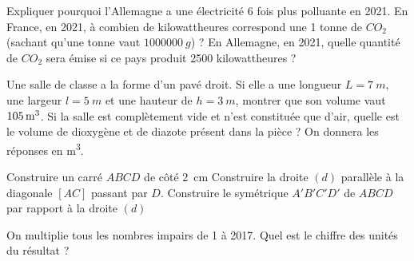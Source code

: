 \documentclass[../Cours.tex]{subfiles}
\begin{document}
\begin{questions}
    \question Expliquer pourquoi l'Allemagne a une électricité 6 fois plus polluante en 2021.
    \question En France, en 2021, à combien de kilowattheures correspond une 1 tonne de $CO_2$ (sachant qu'une tonne vaut $\qty{1000000}{g}$) ?
    \question En Allemagne, en 2021, quelle quantité de $CO_2$ sera émise si ce pays produit \num{2500} kilowattheures ?

    \clearpage

    \question Une salle de classe a la forme d'un pavé droit. Si elle a une longueur $L=\qty{7}{m}$, une largeur $l=\qty{5}{m}$ et une hauteur de $h=\qty{3}{m}$, montrer que son volume vaut $\qty{105}{m\cubed}$.
    \question Si la salle est complètement vide et n'est constituée que d'air, quelle est le volume de dioxygène et de diazote présent dans la pièce ? On donnera les réponses en \unit{\metre\cubed}.


    \question Construire un carré $ABCD$ de côté \qty{2}{\centi\metre}
    \question Construire la droite $(d)$ parallèle à la diagonale $[AC]$ passant par $D$.
    \question Construire le symétrique $A'B'C'D'$ de $ABCD$ par rapport à la droite $(d)$



    \question On multiplie tous les nombres impairs de 1 à 2017. Quel est le chiffre des unités du résultat ?

    
    
\end{questions}
\end{document}
